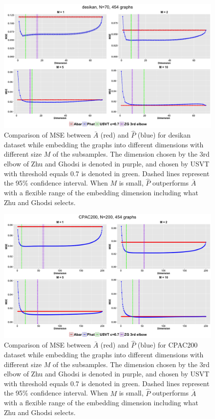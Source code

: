 \documentclass[a4paper]{article}
\begin{document}
\begin{figure}[!htb]
\centering
\includegraphics[width=14cm]{desikan.png}
\caption{Comparison of MSE between $\bar{A}$ (red) and $\hat{P}$ (blue) for desikan dataset while embedding the graphs into different dimensions with different size $M$ of the subsamples. The dimension chosen by the 3rd elbow of Zhu and Ghodsi is denoted in purple, and chosen by USVT with threshold equals 0.7 is denoted in green.  Dashed lines represent the 95\% confidence interval.  When $M$ is small, $\hat{P}$ outperforms $\bar{A}$ with a flexible range of the embedding dimension including what Zhu and Ghodsi selects.}
\label{fig:desikan}
\end{figure}

\begin{figure}[!htb]
\centering
\includegraphics[width=14cm]{CPAC200.png}
\caption{Comparison of MSE between $\bar{A}$ (red) and $\hat{P}$ (blue) for CPAC200 dataset while embedding the graphs into different dimensions with different size $M$ of the subsamples. The dimension chosen by the 3rd elbow of Zhu and Ghodsi is denoted in purple, and chosen by USVT with threshold equals 0.7 is denoted in green.  Dashed lines represent the 95\% confidence interval.  When $M$ is small, $\hat{P}$ outperforms $\bar{A}$ with a flexible range of the embedding dimension including what Zhu and Ghodsi selects.}
\label{fig:CPAC200}
\end{figure}
\end{document}
